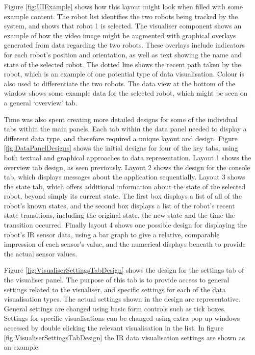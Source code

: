 Figure \ref{fig:UIExample} shows how this layout might look when filled with some example content. The robot list identifies the two robots being tracked by the system, and shows that robot 1 is selected. The visualiser component shows an example of how the video image might be augmented with graphical overlays generated from data regarding the two robots. These overlays include indicators for each robot's position and orientation, as well as text showing the name and state of the selected robot. The dotted line shows the recent path taken by the robot, which is an example of one potential type of data visualisation. Colour is also used to differentiate the two robots. The data view at the bottom of the window shows some example data for the selected robot, which might be seen on a general `overview' tab.

Time was also spent creating more detailed designs for some of the individual tabs within the main panels. Each tab within the data panel needed to display a different data type, and therefore required a unique layout and design. Figure \ref{fig:DataPanelDesigns} shows the initial designs for four of the key tabs, using both textual and graphical approaches to data representation. Layout 1 shows the overview tab design, as seen previously. Layout 2 shows the design for the console tab, which displays messages about the application sequentially. Layout 3 shows the state tab, which offers additional information about the state of the selected robot, beyond simply its current state. The first box displays a list of all of the robot's known states, and the second box displays a list of the robot's recent state transitions, including the original state, the new state and the time the transition occurred. Finally layout 4 shows one possible design for displaying the robot's IR sensor data, using a bar graph to give a relative, comparable impression of each sensor's value, and the numerical displays beneath to provide the actual sensor values. 

Figure \ref{fig:VisualiserSettingsTabDesign} shows the design for the settings tab of the visualiser panel. The purpose of this tab is to provide access to general settings related to the visualiser, and specific settings for each of the data visualisation types. The actual settings shown in the design are representative. General settings are changed using basic form controls such as tick boxes. Settings for specific visualisations can be changed using extra pop-up windows accessed by double clicking the relevant visualisation in the list. In figure \ref{fig:VisualiserSettingsTabDesign} the IR data visualisation settings are shown as an example.

